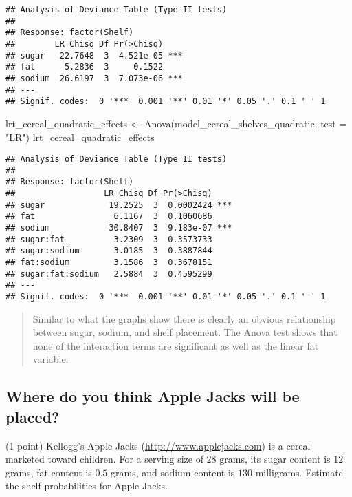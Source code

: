 \documentclass[
  11pt,
]{article}
\newenvironment{Shaded}{\begin{snugshade}}{\end{snugshade}}
\newcommand{\AttributeTok}[1]{\textcolor[rgb]{0.77,0.63,0.00}{#1}}
\newcommand{\FunctionTok}[1]{\textcolor[rgb]{0.00,0.00,0.00}{#1}}
\newcommand{\NormalTok}[1]{#1}
\newcommand{\OtherTok}[1]{\textcolor[rgb]{0.56,0.35,0.01}{#1}}
\newcommand{\StringTok}[1]{\textcolor[rgb]{0.31,0.60,0.02}{#1}}
\begin{document}
\begin{verbatim}
## Analysis of Deviance Table (Type II tests)
## 
## Response: factor(Shelf)
##        LR Chisq Df Pr(>Chisq)    
## sugar   22.7648  3  4.521e-05 ***
## fat      5.2836  3     0.1522    
## sodium  26.6197  3  7.073e-06 ***
## ---
## Signif. codes:  0 '***' 0.001 '**' 0.01 '*' 0.05 '.' 0.1 ' ' 1
\end{verbatim}

\begin{Shaded}
\begin{Highlighting}[]
\NormalTok{lrt\_cereal\_quadratic\_effects }\OtherTok{\textless{}{-}} \FunctionTok{Anova}\NormalTok{(model\_cereal\_shelves\_quadratic, }\AttributeTok{test =} \StringTok{"LR"}\NormalTok{)}
\NormalTok{lrt\_cereal\_quadratic\_effects}
\end{Highlighting}
\end{Shaded}

\begin{verbatim}
## Analysis of Deviance Table (Type II tests)
## 
## Response: factor(Shelf)
##                  LR Chisq Df Pr(>Chisq)    
## sugar             19.2525  3  0.0002424 ***
## fat                6.1167  3  0.1060686    
## sodium            30.8407  3  9.183e-07 ***
## sugar:fat          3.2309  3  0.3573733    
## sugar:sodium       3.0185  3  0.3887844    
## fat:sodium         3.1586  3  0.3678151    
## sugar:fat:sodium   2.5884  3  0.4595299    
## ---
## Signif. codes:  0 '***' 0.001 '**' 0.01 '*' 0.05 '.' 0.1 ' ' 1
\end{verbatim}

\begin{quote}
Similar to what the graphs show there is clearly an obvious relationship
between sugar, sodium, and shelf placement. The Anova test shows that
none of the interaction terms are significant as well as the linear fat
variable.
\end{quote}

\hypertarget{where-do-you-think-apple-jacks-will-be-placed}{%
\subsection{Where do you think Apple Jacks will be
placed?}\label{where-do-you-think-apple-jacks-will-be-placed}}

(1 point) Kellogg's Apple Jacks (\url{http://www.applejacks.com}) is a
cereal marketed toward children. For a serving size of \(28\) grams, its
sugar content is \(12\) grams, fat content is \(0.5\) grams, and sodium
content is \(130\) milligrams. Estimate the shelf probabilities for
Apple Jacks.
\end{document}
